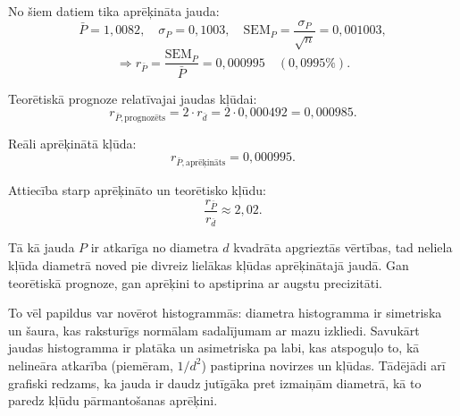 \documentclass[12pt]{article}
\begin{document}
No šiem datiem tika aprēķināta jauda:
\[
\bar{P} = 1{,}0082, \quad \sigma_P = 0{,}1003, \quad \text{SEM}_P = \frac{\sigma_P}{\sqrt{n}} = 0{,}001003,
\]
\[
\Rightarrow r_{\bar{P}} = \frac{\text{SEM}_P}{\bar{P}} = 0{,}000995 \quad (0{,}0995\%).
\]

Teorētiskā prognoze relatīvajai jaudas kļūdai:
\[
r_{\bar{P}, \text{prognozēts}} = 2 \cdot r_{\bar{d}} = 2 \cdot 0{,}000492 = 0{,}000985.
\]

Reāli aprēķinātā kļūda:
\[
r_{\bar{P}, \text{aprēķināts}} = 0{,}000995.
\]

Attiecība starp aprēķināto un teorētisko kļūdu:
\[
\frac{r_{\bar{P}}}{r_{\bar{d}}} \approx 2{,}02.
\]

Tā kā jauda $P$ ir atkarīga no diametra $d$ kvadrāta apgrieztās vērtības, tad neliela kļūda diametrā noved pie divreiz lielākas kļūdas aprēķinātajā jaudā. Gan teorētiskā prognoze, gan aprēķini to apstiprina ar augstu precizitāti.

To vēl papildus var novērot histogrammās: diametra histogramma ir simetriska un šaura, kas raksturīgs normālam sadalījumam ar mazu izkliedi. Savukārt jaudas histogramma ir platāka un asimetriska pa labi, kas atspoguļo to, kā nelineāra atkarība (piemēram, $1/d^2$) pastiprina novirzes un kļūdas. Tādējādi arī grafiski redzams, ka jauda ir daudz jutīgāka pret izmaiņām diametrā, kā to paredz kļūdu pārmantošanas aprēķini.\\
\end{document}
